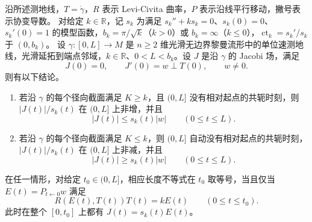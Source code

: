\begin{theorem}\label{g3:thm:rauch-model-comparison}
	沿所述测地线，\(T=\dot\gamma\)，\(R\) 表示 Levi-Civita 曲率，\(P\) 表示沿线平行移动，撇号表示协变导数。
	对给定 \(k\in\mathbb R\)，记 \(s_k\) 为满足 \(s_k''+ks_k=0\)、\(s_k(0)=0\)、\(s_k'(0)=1\) 的模型函数，\(b_k=\pi/\sqrt k\)（\(k>0\)）或 \(b_k=\infty\)（\(k\le0\)），\(\operatorname{ct}_k=s_k'/s_k\) 于 \((0,b_k)\)。
	设 \(\gamma:[0,L]\to M\) 是 \(n\ge2\) 维光滑无边界黎曼流形中的单位速测地线，光滑延拓到端点邻域，\(k\in\mathbb R\)、\(0<L<b_k\)。设 \(J\) 是沿 \(\gamma\) 的 Jacobi 场，满足
	\[
		J(0)=0,\qquad J'(0)=w\perp T(0),\qquad w\ne0.
	\]
	则有以下结论。
	\begin{enumerate}
		\item 若沿 \(\gamma\) 的每个径向截面满足 \(K\ge k\)，且 \((0,L]\) 没有相对起点的共轭时刻，则 \(|J(t)|/s_k(t)\) 在 \((0,L]\) 上非增，并且
		\begin{equation}\label{g3:eq:rauch-model-upper}
			|J(t)|\le s_k(t)|w|\qquad(0\le t\le L).
		\end{equation}
		\item 若沿 \(\gamma\) 的每个径向截面满足 \(K\le k\)，则 \((0,L]\) 自动没有相对起点的共轭时刻，\(|J(t)|/s_k(t)\) 在 \((0,L]\) 上非减，并且
		\begin{equation}\label{g3:eq:rauch-model-lower}
			|J(t)|\ge s_k(t)|w|\qquad(0\le t\le L).
		\end{equation}
	\end{enumerate}
	在任一情形，对给定 \(t_0\in(0,L]\)，相应长度不等式在 \(t_0\) 取等号，当且仅当 \(E(t)=P_{t\leftarrow0}w\) 满足
	\begin{equation}\label{g3:eq:rauch-directional-equality}
		R(E(t),T(t))T(t)=kE(t)\qquad(0\le t\le t_0).
	\end{equation}
	此时在整个 \([0,t_0]\) 上都有 \(J(t)=s_k(t)E(t)\)。
\end{theorem}
